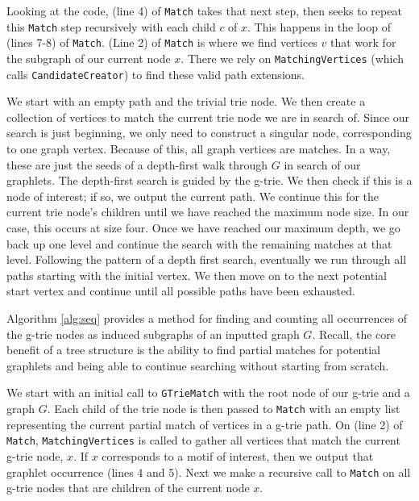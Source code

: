 \documentclass[12pt,twoside]{reedthesis}
\begin{document}
Looking at the code, (line 4) of \texttt{Match} takes that next step, then seeks to repeat this \texttt{Match} step recursively with each child $c$ of $x$. This happens in the loop of (lines 7-8) of \texttt{Match}. (Line 2) of \texttt{Match} is where we find vertices $v$ that work for the subgraph of our current node $x$. There we rely on \texttt{MatchingVertices}  (which calls \texttt{CandidateCreator}) to find these valid path extensions. 

We start with an empty path and the trivial trie node. We then create a collection of vertices to match the current trie node we are in search of. Since our search is just beginning, we only need to construct a singular node,  corresponding to one graph vertex. Because of this, all graph vertices are matches. In a way, these are just the seeds of a depth-first walk through $G$ in search of our graphlets. The depth-first search is guided by the g-trie. We then check if this is a node of interest; if so, we output the current path. We continue this for the current trie node's children until we have reached the maximum node size. In our case, this occurs at size four. Once we have reached our maximum depth, we go back up one level and continue the search with the remaining matches at that level. Following the pattern of a depth first search, eventually we run through all paths starting with the initial vertex. We then move on to the next potential start vertex and continue until all possible paths have been exhausted.

Algorithm \ref{alg:seq} provides a method for finding and counting all occurrences of the g-trie nodes as induced subgraphs of an inputted graph $G$. Recall, the core benefit of a tree structure is the ability to find partial matches for potential graphlets and being able to continue searching without starting from scratch.

We start with an initial call to \texttt{GTrieMatch} with the root node of our g-trie and a graph $G$. Each child of the trie node is then passed to \texttt{Match} with an empty list representing the current partial match of vertices in a g-trie path. On (line 2) of \texttt{Match}, \texttt{MatchingVertices} is called to gather all vertices that match the current g-trie node, $x$. If $x$ corresponds to a motif of interest, then we output that graphlet occurrence (lines 4 and 5). Next we make a recursive call to \texttt{Match} on all g-trie nodes that are children
of the current node $x$. 
\end{document}
